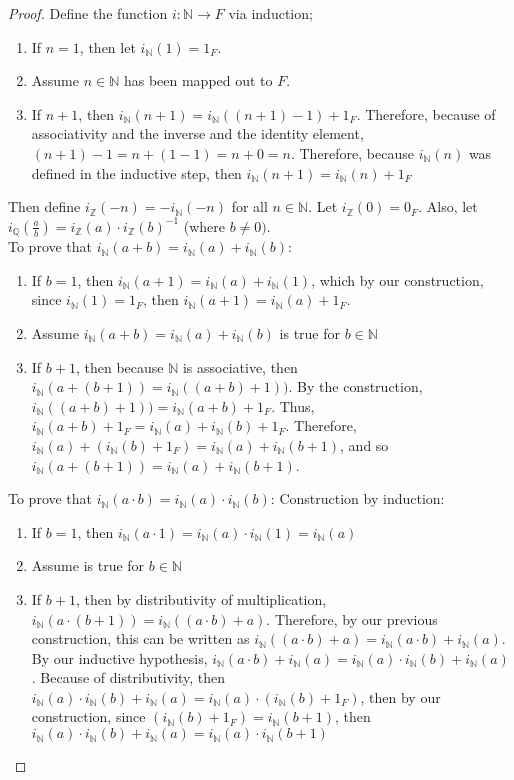 \documentclass[openany, amssymb, psamsfonts]{amsart}
\newcommand{\bbN}{\mathbb{N}}
\newcommand{\bbQ}{\mathbb{Q}}
\newcommand{\bbZ}{\mathbb{Z}}
\newcommand{\arr}{\longrightarrow}
\theoremstyle{definition}
\numberwithin{equation}{section}
\begin{document}
\begin{proof}
Define the function $i\colon \bbN \arr F$ via induction;
\begin{enumerate}
    \item If $n=1$, then let $i_\bbN(1) = 1_F$.
    \item Assume $n\in \bbN$ has been mapped out to $F$.
    \item If $n+1$, then $i_\bbN(n+1) = i_\bbN((n+1)-1) + 1_F$. Therefore, because of associativity and the inverse and the identity element, $(n+1)-1 = n+(1-1) = n+0 = n$. Therefore, because $i_\bbN(n)$ was defined in the inductive step, then $i_\bbN(n+1) = i_\bbN(n) + 1_F$
\end{enumerate}
Then define $i_\bbZ (-n) = -i_\bbN (-n)$ for all $n\in \bbN$. Let $i_\bbZ (0) = 0_F$. Also, let $i_\bbQ(\frac{a}{b}) = i_\bbZ(a) \cdot i_\bbZ (b)^{-1}$ (where $b\neq 0)$. \\ 
To prove that $i_\bbN(a+b) = i_\bbN (a) + i_\bbN (b)$:
\begin{enumerate}
    \item If $b=1$, then $i_\bbN (a+1)= i_\bbN(a) + i_\bbN(1)$, which by our construction, since $i_\bbN (1) = 1_F$, then $i_\bbN (a+1)= i_\bbN(a) + 1_F$. 
    \item Assume $i_\bbN(a+b) = i_\bbN(a) + i_\bbN(b)$ is true for $b\in \bbN$
    \item If $b+1$, then because $\bbN$ is associative, then $i_\bbN(a+(b+1)) = i_\bbN((a+b)+1))$. By the construction, $i_\bbN((a+b)+1)) = i_\bbN(a+b) +1_F$. Thus, $i_\bbN(a+b) +1_F= i_\bbN(a)+i_\bbN(b)+1_F$. Therefore,  $i_\bbN(a) +( i_\bbN(b)+1_F) = i_\bbN(a)+i_\bbN(b+1)$, and so $i_\bbN(a+(b+1)) = i_\bbN(a)+i_\bbN(b+1)$.
\end{enumerate}
To prove that $i_\bbN (a\cdot b) = i_\bbN(a) \cdot i_\bbN(b)$:
Construction by induction:
\begin{enumerate}
    \item If $b=1$, then $i_\bbN(a\cdot 1) = i_\bbN(a) \cdot i_\bbN(1) = i_\bbN(a)$
    \item Assume is true for $b\in \bbN$
    \item If $b+1$, then by distributivity of multiplication, $i_\bbN(a\cdot (b+1)) = i_\bbN((a\cdot b) + a)$. Therefore, by our previous construction, this can be written as $i_\bbN((a\cdot b) + a)= i_\bbN(a\cdot b) + i_\bbN(a)$. By our inductive hypothesis,  $i_\bbN(a\cdot b) + i_\bbN(a) = i_\bbN(a) \cdot i_\bbN(b) + i_\bbN(a)$. Because of distributivity, then $i_\bbN(a) \cdot i_\bbN(b) + i_\bbN(a) = i_\bbN(a) \cdot (i_\bbN(b) +1_F)$, then by our construction, since $(i_\bbN(b) +1_F) = i_\bbN(b+1)$, then $i_\bbN(a) \cdot i_\bbN(b) + i_\bbN(a) = i_\bbN(a) \cdot i_\bbN(b+1)$

\end{enumerate}
\end{proof}
\end{document}
